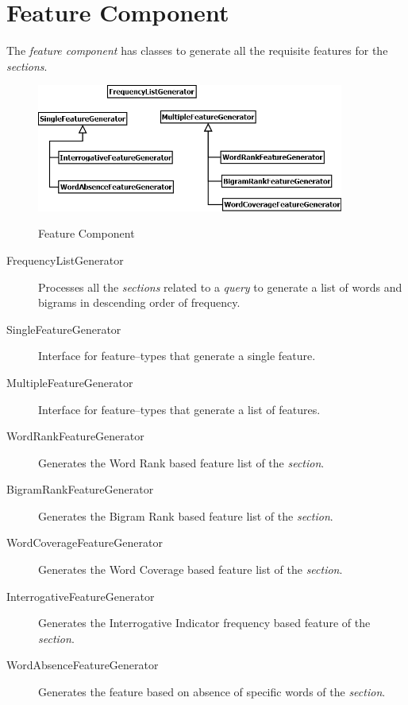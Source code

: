 \documentclass[a4paper,10pt]{report}
\begin{document}
\clearpage


\section{Feature Component}

The \emph{feature component} has classes to generate all the requisite features for the \emph{sections}. \\

\begin{figure}[h!]
\centering
\includegraphics[width=0.90\textwidth]{./diagrams/Feature}\\
\caption{Feature Component}
\end{figure}

\begin{description}
	\item[FrequencyListGenerator] Processes all the \emph{sections} related to a \emph{query} to generate a list of words and bigrams in descending order of frequency.
	\item[SingleFeatureGenerator] Interface for feature--types that generate a single feature.
	\item[MultipleFeatureGenerator] Interface for feature--types that generate a list of features.
	\item[WordRankFeatureGenerator] Generates the Word Rank based feature list of the \emph{section}.
	\item[BigramRankFeatureGenerator] Generates the Bigram Rank based feature list of the \emph{section}.
	\item[WordCoverageFeatureGenerator] Generates the Word Coverage based feature list of the \emph{section}.
	\item[InterrogativeFeatureGenerator] Generates the Interrogative Indicator frequency based feature of the \emph{section}.
	\item[WordAbsenceFeatureGenerator] Generates the feature based on absence of specific words of the \emph{section}.
\end{description}
\end{document}
